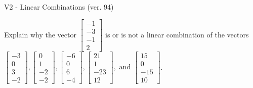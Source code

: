 \begin{exercise}
  \begin{exerciseTitle}V2 - Linear Combinations (ver. 94)\end{exerciseTitle}
  \begin{exerciseStatement}
    Explain why the vector \(\left[\begin{array}{c}
-1 \\
-3 \\
-1 \\
2
\end{array}\right]\)  is or is not a linear 
	combination of the vectors \(\left[\begin{array}{c}
-3 \\
0 \\
3 \\
-2
\end{array}\right] , \left[\begin{array}{c}
0 \\
1 \\
-2 \\
-2
\end{array}\right] , \left[\begin{array}{c}
-6 \\
0 \\
6 \\
-4
\end{array}\right] , \left[\begin{array}{c}
21 \\
1 \\
-23 \\
12
\end{array}\right] , \text{ and } \left[\begin{array}{c}
15 \\
0 \\
-15 \\
10
\end{array}\right]\).
	



\end{exerciseStatement}
\end{exercise}
